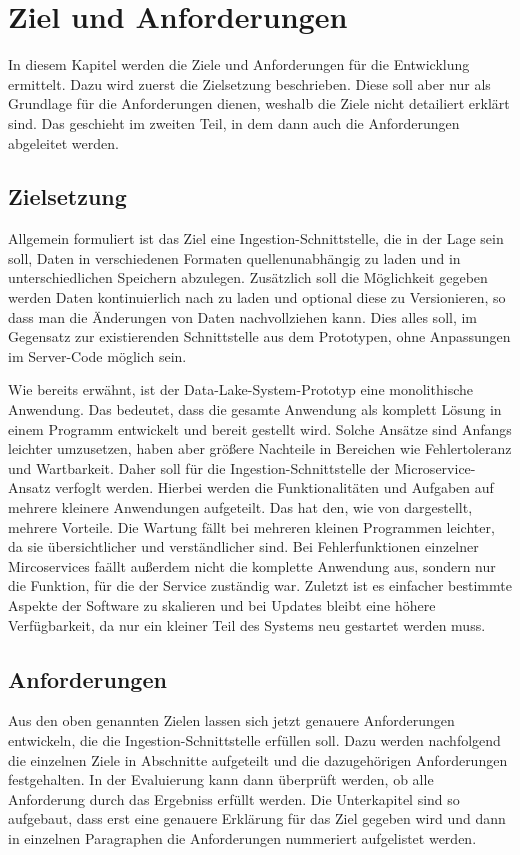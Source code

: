 \chapter{Ziel und Anforderungen}
In diesem Kapitel werden die Ziele und Anforderungen für die Entwicklung ermittelt.
Dazu wird zuerst die Zielsetzung beschrieben.
Diese soll aber nur als Grundlage für die Anforderungen dienen, weshalb die Ziele nicht detailiert erklärt sind.
Das geschieht im zweiten Teil, in dem dann auch die Anforderungen abgeleitet werden.

\section{Zielsetzung}
Allgemein formuliert ist das Ziel eine Ingestion-Schnittstelle, die in der Lage sein soll, Daten in verschiedenen Formaten quellenunabhängig zu laden und in unterschiedlichen Speichern abzulegen.
Zusätzlich soll die Möglichkeit gegeben werden Daten kontinuierlich nach zu laden und optional diese zu Versionieren, so dass man die Änderungen von Daten nachvollziehen kann.
Dies alles soll, im Gegensatz zur existierenden Schnittstelle aus dem Prototypen, ohne Anpassungen im Server-Code möglich sein.

Wie bereits erwähnt, ist der Data-Lake-System-Prototyp eine monolithische Anwendung.
Das bedeutet, dass die gesamte Anwendung als komplett Lösung in einem Programm entwickelt und bereit gestellt wird.
Solche Ansätze sind Anfangs leichter umzusetzen, haben aber größere Nachteile in Bereichen wie Fehlertoleranz und Wartbarkeit.
Daher soll für die Ingestion-Schnittstelle der Microservice-Ansatz verfoglt werden.
Hierbei werden die Funktionalitäten und Aufgaben auf mehrere kleinere Anwendungen aufgeteilt.
Das hat den, wie von \textcite{microservices} dargestellt, mehrere Vorteile.
Die Wartung fällt bei mehreren kleinen Programmen leichter, da sie übersichtlicher und verständlicher sind.
Bei Fehlerfunktionen einzelner Mircoservices faällt außerdem nicht die komplette Anwendung aus, sondern nur die Funktion, für die der Service zuständig war.
Zuletzt ist es einfacher bestimmte Aspekte der Software zu skalieren und bei Updates bleibt eine höhere Verfügbarkeit, da nur ein kleiner Teil des Systems neu gestartet werden muss.

\section{Anforderungen}
Aus den oben genannten Zielen lassen sich jetzt genauere Anforderungen entwickeln, die die Ingestion-Schnittstelle erfüllen soll.
Dazu werden nachfolgend die einzelnen Ziele in Abschnitte aufgeteilt und die dazugehörigen Anforderungen festgehalten.
In der Evaluierung kann dann überprüft werden, ob alle Anforderung durch das Ergebniss erfüllt werden.
Die Unterkapitel sind so aufgebaut, dass erst eine genauere Erklärung für das Ziel gegeben wird und dann in einzelnen Paragraphen die Anforderungen nummeriert aufgelistet werden.

